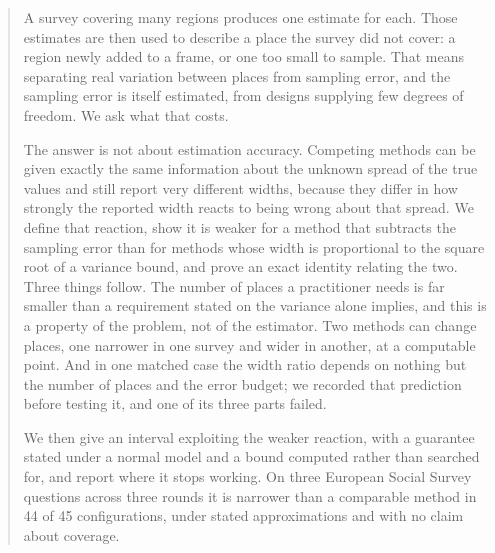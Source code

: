 \begin{abstract}
\noindent
A survey covering many regions produces one estimate for each. Those
estimates are then used to describe a place the survey did not cover: a region
newly added to a frame, or one too small to sample. That means separating real
variation between places from sampling error, and the sampling error is itself
estimated, from designs supplying few degrees of freedom. We ask what that
costs.

The answer is not about estimation accuracy. Competing methods can be given
exactly the same information about the unknown spread of the true values and
still report very different widths, because they differ in how strongly the
reported width reacts to being wrong about that spread. We define that reaction,
show it is weaker for a method that subtracts the sampling error than for methods
whose width is proportional to the square root of a variance bound, and prove an
exact identity relating the two. Three things follow. The number of places a
practitioner needs is far smaller than a requirement stated on the variance alone
implies, and this is a property of the problem, not of the estimator. Two methods can change places, one narrower in one survey
and wider in another, at a computable point. And in one matched case the width
ratio depends on nothing but the number of places and the error budget; we
recorded that prediction before testing it, and one of its three parts failed.

We then give an interval exploiting the weaker reaction, with a guarantee stated
under a normal model and a bound computed rather than searched for, and report
where it stops working. On three European Social Survey questions
across three rounds it is narrower than a comparable method in 44 of 45 configurations,
under stated approximations and with no claim about coverage.
\end{abstract}
